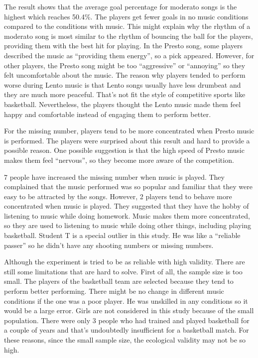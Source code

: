 \documentclass{article}
\begin{document}
The result shows that the average goal percentage for moderato songs is the highest which reaches 50.4\%. The players get fewer goals in no music conditions compared to the conditions with music. This might explain why the rhythm of a moderato song is most similar to the rhythm of bouncing the ball for the players, providing them with the best hit for playing. In the Presto song, some players described the music as ``providing them energy'', so a pick appeared. However, for other players, the Presto song might be too ``aggressive'' or ``annoying'' so they felt uncomfortable about the music. The reason why players tended to perform worse during Lento music is that Lento songs usually have less drumbeat and they are much more peaceful. That's not fit the style of competitive sports like basketball. Nevertheless, the players thought the Lento music made them feel happy and comfortable instead of engaging them to perform better.

For the missing number, players tend to be more concentrated when Presto music is performed. The players were surprised about this result and hard to provide a possible reason. One possible suggestion is that the high speed of Presto music makes them feel ``nervous'', so they become more aware of the competition. 

7 people have increased the missing number when music is played. They complained that the music performed was so popular and familiar that they were easy to be attracted by the songs. However, 2 players tend to behave more concentrated when music is played. They suggested that they have the hobby of listening to music while doing homework. Music makes them more concentrated, so they are used to listening to music while doing other things, including playing basketball. Student T is a special outlier in this study. He was like a ``reliable passer'' so he didn't have any shooting numbers or missing numbers.

Although the experiment is tried to be as reliable with high validity. There are still some limitations that are hard to solve. First of all, the sample size is too small. The players of the basketball team are selected because they tend to perform better performing. There might be no change in different music conditions if the one was a poor player. He was unskilled in any conditions so it would be a large error. Girls are not considered in this study because of the small population. There were only 3 people who had trained and played basketball for a couple of years and that's undoubtedly insufficient for a basketball match. For these reasons, since the small sample size, the ecological validity may not be so high.
\end{document}
